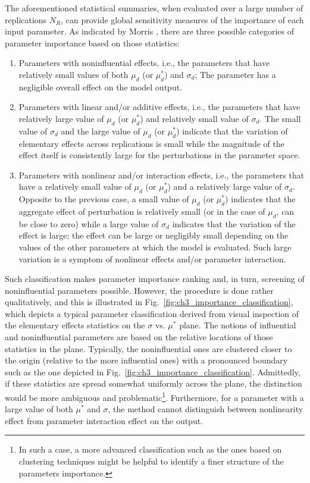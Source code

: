 The aforementioned statistical summaries, when evaluated over a large number of replications $N_R$,
can provide global sensitivity measures of the importance of each input parameter.
As indicated by Morris \cite{Morris1991}, there are three possible categories of parameter importance based on those statistics:
\begin{enumerate}
	\item Parameters with noninfluential effects, i.e., the parameters that have relatively small values of both $\mu_d$ (or $\mu^*_d$) and $\sigma_d$;
	The parameter has a negligible overall effect on the model output.
	\item Parameters with linear and/or additive effects, i.e., the parameters that have relatively large value of $\mu_d$ (or $\mu^*_d$) and relatively small value of $\sigma_d$.
	The small value of $\sigma_d$ and the large value of $\mu_d$ (or $\mu^*_d$) indicate that the variation of elementary effects across replications is small while the magnitude of the effect itself is consistently large for the perturbations in the parameter space.
	\item Parameters with nonlinear and/or interaction effects, i.e., the parameters that have a relatively small value of $\mu_d$ (or $\mu^*_d$) and a relatively large value of $\sigma_d$.
	Opposite to the previous case, a small value of $\mu_d$ (or $\mu^*_d$) indicates that the aggregate effect of perturbation is relatively small (or in the case of $\mu_d$, can be close to zero) while a large value of $\sigma_d$ indicates that the variation of the effect is large; the effect can be large or negligibly small depending on the values of the other parameters at which the model is evaluated.
	Such large variation is a symptom of nonlinear effects and/or parameter interaction.
\end{enumerate}

Such classification makes parameter importance ranking and, in turn, screening of noninfluential parameters possible.
However, the procedure is done rather qualitatively, and this is illustrated in Fig.~\ref{fig:ch3_importance_classification}, 
which depicts a typical parameter classification derived from visual inspection of the elementary effects statistics on the $\sigma$ vs. $\mu^*$ plane.
The notions of influential and noninfluential parameters are based on the relative locations of those statistics in the plane.
Typically, the noninfluential ones are clustered closer to the origin (relative to the more influential ones) with a pronounced boundary such as the one depicted in Fig.~\ref{fig:ch3_importance_classification}. 
Admittedly, if these statistics are spread somewhat uniformly across the plane, 
the distinction would be more ambiguous and problematic\footnote{In such a case, a more advanced classification such as the ones based on clustering techniques might be helpful to identify a finer structure of the parameters importance.}.
Furthermore, for a parameter with a large value of both $\mu^*$ and $\sigma$,
the method cannot distinguish between nonlinearity effect from parameter interaction effect on the output.


